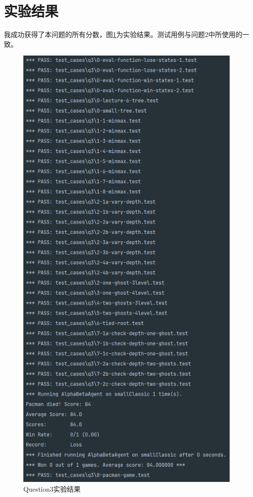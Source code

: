 \section{实验结果}
%
%
我成功获得了本问题的所有分数，图\ref{q3}为实验结果。测试用例与问题2中所使用的一致。
\begin{figure}[H]
    \centering
    \includegraphics[scale = 0.8]{pic/q3.png}
    \caption{Question3实验结果}\label{q3}
\end{figure}
%
%
%
%
%
